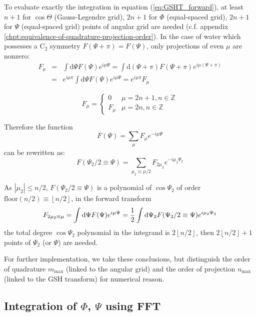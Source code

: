 To evaluate exactly the integration in equation (\ref{eq:GSHT_forward}),
at least $n+1$ for $\cos\Theta$ (Gauss-Legendre grid), $2n+1$ for
$\Phi$ (equal-spaced grid), $2n+1$ for $\Psi$ (equal-spaced grid)
points of angular grid are needed (c.f. appendix \ref{chpt:equivalence-of-quadrature-projection-order}).
In the case of water which possesses a $\mathrm{C}_{2}$ symmetry
$F(\Psi+\pi)=F(\Psi)$, only projections of even $\mu$ are nonzero:
\begin{eqnarray}
F_{\mu} & = & \int\mathrm{d}\Psi F(\Psi)e^{i\mu\Psi}=\int\mathrm{d}(\Psi+\pi)F(\Psi+\pi)e^{i\mu(\Psi+\pi)}\nonumber \\
 & = & e^{i\mu\pi}\int\mathrm{d}\Psi F(\Psi)e^{i\mu\Psi}=e^{i\mu\pi}F_{\mu}
\end{eqnarray}

\begin{equation}
F_{\mu}=\begin{cases}
0 & \mu=2n+1,n\in\mathbb{Z}\\
F_{\mu} & \mu=2n,n\in\mathbb{Z}
\end{cases}
\end{equation}

Therefore the function
\begin{equation}
F(\Psi)=\sum_{\mu}F_{\mu}e^{-i\mu\Psi}
\end{equation}
can be rewritten as:
\begin{equation}
F(\Psi_{2}/2\equiv\Psi)=\sum_{\mu_{2}\equiv\mu/2}F_{2\mu_{2}}e^{-i\mu_{2}\Psi_{2}}
\end{equation}

As $\left|\mu_{2}\right|\leq n/2$, $F(\Psi_{2}/2\equiv\Psi)$ is
a polynomial of $\cos\Psi_{2}$ of order $\mathrm{floor}(n/2)\equiv\left\lfloor n/2\right\rfloor $,
in the forward transform
\begin{equation}
F_{2\mu_{2}\equiv\mu}=\intop\mathrm{d}\Psi F(\Psi)e^{i\mu\Psi}=\frac{1}{2}\intop\mathrm{d}\Psi_{2}F(\Psi_{2}/2\equiv\Psi)e^{i\mu_{2}\Psi_{2}}
\end{equation}
the total degree $\cos\Psi_{2}$ polynomial in the integrand is $2\left\lfloor n/2\right\rfloor $,
then $2\left\lfloor n/2\right\rfloor +1$ points of $\Psi_{2}$ (or
$\Psi$) are needed. 

For further implementation, we take these conclusions, but distinguish
the order of quadrature $m_{\mathrm{max}}$ (linked to the angular
grid) and the order of projection $n_{\mathrm{max}}$ (linked to the
\acs{GSH} transform) for numerical reason.

\subsection{Integration of $\Phi$, $\Psi$ using FFT}

